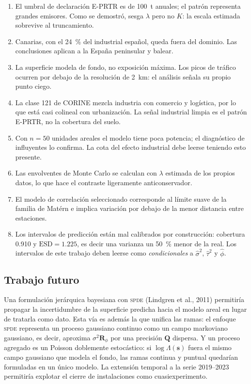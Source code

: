 \documentclass[11pt,a4paper]{article}
\newcommand{\loc}{\bm{s}}
\newcommand{\varesp}{\sigma^{2}}
\newcommand{\pepita}{\tau^{2}}
\newcommand{\escala}{\phi}
\newcommand{\Rphi}{\bm{R}_{\escala}}
\newcommand{\Prec}{\bm{Q}}
\begin{document}
\begin{enumerate}[label=(\roman*), leftmargin=1.8em, itemsep=2pt]
  \item El umbral de declaración E-PRTR es de \SI{100}{\tonne} anuales; el
  patrón representa grandes emisores. Como se demostró, sesga $\lambda$ pero no
  $K$: la escala estimada sobrevive al truncamiento.
  \item Canarias, con el \SI{24}{\percent} del  industrial español,
  queda fuera del dominio. Las conclusiones aplican a la España peninsular y
  balear.
  \item La superficie modela  de fondo, no exposición máxima. Los picos
  de tráfico ocurren por debajo de la resolución de \SI{2}{\kilo\metre}: el
  análisis señala su propio punto ciego.
  \item La clase 121 de CORINE mezcla industria con comercio y logística, por
  lo que está casi colineal con urbanización. La señal industrial limpia es el
  patrón E-PRTR, no la cobertura del suelo.
  \item Con $n=\num{50}$ unidades areales el modelo tiene poca potencia; el
  diagnóstico de influyentes lo confirma. La cota del efecto industrial debe
  leerse teniendo esto presente.
  \item Las envolventes de Monte Carlo se calculan con $\lambda$ estimada de
  los propios datos, lo que hace el contraste ligeramente anticonservador.
  \item El modelo de correlación seleccionado corresponde al límite suave de la
  familia de Matérn e implica variación por debajo de la menor distancia entre
  estaciones.
  \item Los intervalos de predicción están mal calibrados por construcción:
  cobertura \num{0.910} y $\mathrm{ESD}=\num{1.225}$, es decir una varianza un
  \SI{50}{\percent} menor de la real. Los intervalos de este trabajo deben
  leerse como \emph{condicionales} a $\hat\varesp$, $\hat\pepita$ y
  $\hat\escala$.
\end{enumerate}

\subsection*{Trabajo futuro}

Una formulación jerárquica bayesiana con \textsc{spde} (Lindgren et al., 2011)
permitiría propagar la incertidumbre de la superficie predicha hacia el modelo
areal en lugar de tratarla como dato. Esta vía es además la que unifica las
ramas: el enfoque \textsc{spde} representa un proceso gaussiano continuo como
un campo markoviano gaussiano, es decir, aproxima $\varesp\Rphi$ por una
precisión $\Prec$ dispersa. Y un proceso agregado es un Poisson doblemente
estocástico: si $\log\Lambda(\loc)$ fuera el mismo campo gaussiano que modela
el fondo, las ramas continua y puntual quedarían formuladas en un único modelo.
La extensión temporal a la serie 2019--2023 permitiría explotar el cierre de
instalaciones como cuasiexperimento.
\end{document}
